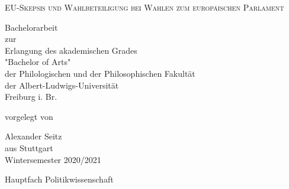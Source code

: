 \thispagestyle{empty}

\begin{center}

\vspace*{5cm}

\huge\textsc{EU-Skepsis und Wahlbeteiligung bei Wahlen zum europäischen Parlament}\\

\vspace*{2.5cm}

\normalsize
Bachelorarbeit\\
zur\\
Erlangung des akademischen Grades\\ 
"Bachelor of Arts"\\
der Philologischen und der Philosophischen Fakultät\\
der Albert-Ludwigs-Universität\\
Freiburg i. Br.\\

\vspace*{2cm}

vorgelegt von\\

\vspace*{1.5cm}

Alexander Seitz\\

aus Stuttgart\\

\vspace*{1.5cm}
Wintersemester 2020/2021\\

\vspace*{1.5cm}

Hauptfach Politikwissenschaft\\

\end{center}

\newpage
